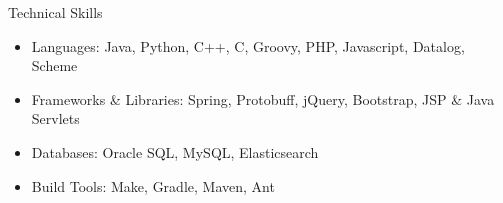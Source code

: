 \documentclass{resume}
\begin{document}
\newcommand{\mytilde}{\raise.17ex\hbox{$\scriptstyle\mathtt{\sim}$}}
\newcommand{\indentitem}{\setlength\itemindent{25pt}}


\begin{rSection}{Technical Skills}
    \begin{itemize}[label={-}]
      \setlength\itemsep{-0.5em}
        \item Languages: Java, Python, C++, C, Groovy, PHP, Javascript, Datalog, Scheme
        \item Frameworks \& Libraries: Spring, Protobuff, jQuery, Bootstrap, JSP \& Java Servlets
        \item Databases: Oracle SQL, MySQL, Elasticsearch
        \item Build Tools: Make, Gradle, Maven, Ant
    \end{itemize}
\end{rSection}
\end{document}
